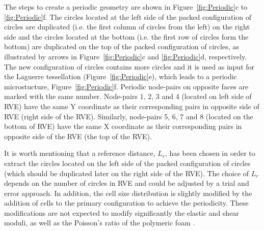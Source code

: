 \documentclass[review]{elsarticle}
\begin{document}
The steps to create a periodic geometry are shown in Figure~\ref{fig:Periodic}c to \ref{fig:Periodic}f. The circles located at the left side of the packed configuration of circles are duplicated (i.e. the first column of circles from the left) on the right side and the circles located at the bottom (i.e. the first row of circles form the bottom) are duplicated on the top of the packed configuration of circles, as illustrated by arrows in Figure~\ref{fig:Periodic}c and \ref{fig:Periodic}d, respectively. The new configuration of circles contains more circles and it is used as input for the Laguerre tessellation (Figure~\ref{fig:Periodic}e), which leads to a periodic microstucture, Figure~\ref{fig:Periodic}f. Periodic node-pairs on opposite faces are marked with the same number. Node-pairs 1, 2, 3 and 4 (located on left side of RVE) have the same Y coordinate as their corresponding pairs in opposite side of RVE (right side of the RVE). Similarly, node-pairs 5, 6, 7 and 8 (located on the bottom of RVE) have the same X coordinate as their corresponding pairs in opposite side of the RVE (the top of  the RVE).

It is worth mentioning that a reference distance, $L_r$, has been chosen in order to extract the circles located on the left side of the packed configuration of circles (which should be duplicated later on the right side of the RVE). The choice of $L_r$ depends on the number of circles in RVE and could be adjusted by a trial and error approach. In addition, the cell size distribution is slightly modified by the addition of cells to the primary configuration to achieve the periodicity. These modifications are not expected to modify significantly the elastic and shear moduli, as well as the Poisson’s ratio of the polymeric foam \citep{Köll201611}.  
\end{document}
